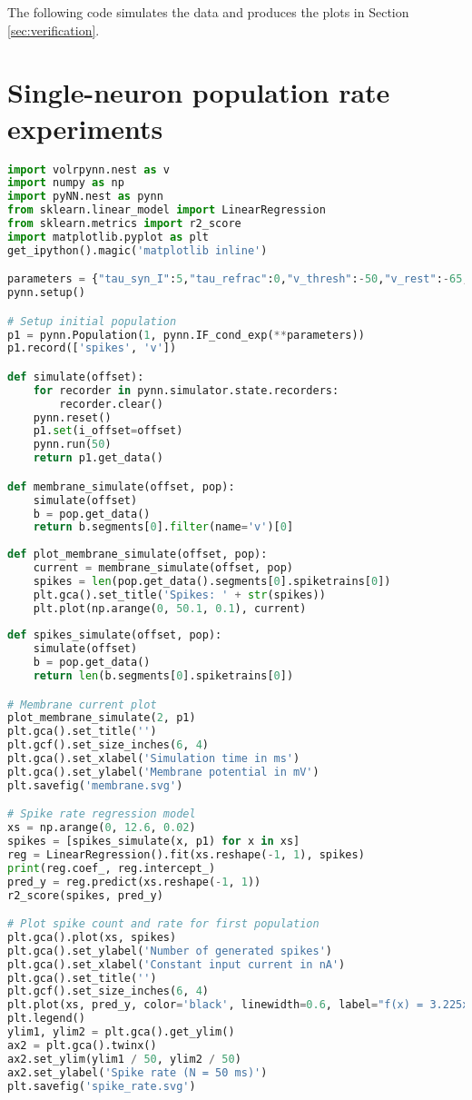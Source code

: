 The following code simulates the data and produces the plots in Section \ref{sec:verification}.

\section{Single-neuron population rate experiments}
\begin{lstlisting}[language=Python]
import volrpynn.nest as v
import numpy as np
import pyNN.nest as pynn
from sklearn.linear_model import LinearRegression
from sklearn.metrics import r2_score
import matplotlib.pyplot as plt
get_ipython().magic('matplotlib inline')

parameters = {"tau_syn_I":5,"tau_refrac":0,"v_thresh":-50,"v_rest":-65,"tau_syn_E":5,"v_reset":-65,"tau_m":20,"e_rev_I":-70,"i_offset":0,"cm":1,"e_rev_E":0}
pynn.setup()

# Setup initial population
p1 = pynn.Population(1, pynn.IF_cond_exp(**parameters))
p1.record(['spikes', 'v'])

def simulate(offset):
    for recorder in pynn.simulator.state.recorders:
        recorder.clear()
    pynn.reset()
    p1.set(i_offset=offset)
    pynn.run(50)
    return p1.get_data()

def membrane_simulate(offset, pop):
    simulate(offset)
    b = pop.get_data()
    return b.segments[0].filter(name='v')[0]
    
def plot_membrane_simulate(offset, pop):
    current = membrane_simulate(offset, pop)
    spikes = len(pop.get_data().segments[0].spiketrains[0])
    plt.gca().set_title('Spikes: ' + str(spikes))
    plt.plot(np.arange(0, 50.1, 0.1), current)
    
def spikes_simulate(offset, pop):
    simulate(offset)
    b = pop.get_data()
    return len(b.segments[0].spiketrains[0])

# Membrane current plot
plot_membrane_simulate(2, p1)
plt.gca().set_title('')
plt.gcf().set_size_inches(6, 4)
plt.gca().set_xlabel('Simulation time in ms')
plt.gca().set_ylabel('Membrane potential in mV')
plt.savefig('membrane.svg')

# Spike rate regression model
xs = np.arange(0, 12.6, 0.02)
spikes = [spikes_simulate(x, p1) for x in xs]
reg = LinearRegression().fit(xs.reshape(-1, 1), spikes)
print(reg.coef_, reg.intercept_)
pred_y = reg.predict(xs.reshape(-1, 1))
r2_score(spikes, pred_y)

# Plot spike count and rate for first population
plt.gca().plot(xs, spikes)
plt.gca().set_ylabel('Number of generated spikes')
plt.gca().set_xlabel('Constant input current in nA')
plt.gca().set_title('')
plt.gcf().set_size_inches(6, 4)
plt.plot(xs, pred_y, color='black', linewidth=0.6, label="f(x) = 3.225x - 1.615", linestyle="-.")
plt.legend()
ylim1, ylim2 = plt.gca().get_ylim()
ax2 = plt.gca().twinx()
ax2.set_ylim(ylim1 / 50, ylim2 / 50)
ax2.set_ylabel('Spike rate (N = 50 ms)')
plt.savefig('spike_rate.svg')



\end{lstlisting}
